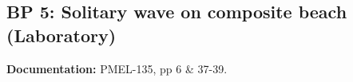 \newsection

\subsection{BP 5:
 Solitary wave on composite beach (Laboratory) }

{\bf Documentation:}  PMEL-135, pp 6 \& 37-39.
